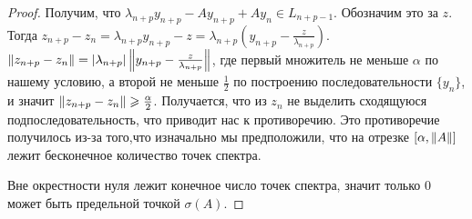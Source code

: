 \documentclass{article}
\begin{document}
\begin{proof}
    Получим, что $\lambda_{n+p} y_{n+p} - Ay_{n+p} + Ay_{n} \in L_{n+p-1}$. Обозначим это за $z$. Тогда $z_{n+p} - z_{n} = \lambda_{n+p}y_{n+p} - z = \lambda_{n+p}(y_{n+p} - \frac{z}{\lambda_{n+p}})$. $\left\|z_{n+p} - z_{n}\right\| = \left|\lambda_{n+p}\right|\left\|y_{n+p} - \frac{z}{\lambda_{n+p}}\right\|$, где первый множитель не меньше $\alpha$ по нашему условию, а второй не меньше $\frac{1}{2}$ по построению последовательности $\{y_n\}$, и значит $\left\|z_{n+p} - z_{n}\right\| \geqslant \frac{\alpha}{2}$. Получается, что из $z_n$ не выделить сходящуюся подпоследовательность, что приводит нас к противоречию. Это противоречие получилось из-за того,что изначально мы предположили, что на отрезке $[\alpha,  \left\|A\right\|]$ лежит бесконечное количество точек спектра. 
    
    Вне окрестности нуля лежит конечное число точек спектра, значит только 0 может быть предельной точкой $\sigma(A)$.


\end{proof}
\end{document}
